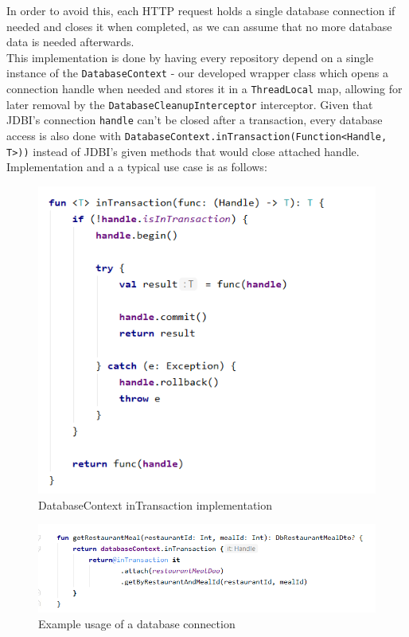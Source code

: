 In order to avoid this, each HTTP request holds a single database connection if needed
and closes it when completed, as we can assume that no more database data is needed afterwards.\\

This implementation is done by having every repository depend on a single instance of
the \texttt{DatabaseContext} - our developed wrapper class which opens a connection handle when needed
and stores it in a \texttt{ThreadLocal} map, allowing for later removal by the \texttt{DatabaseCleanupInterceptor} interceptor.
Given that JDBI's connection \texttt{handle} can't be closed after a transaction, every database access is also done with
\texttt{DatabaseContext.inTransaction(Function<Handle, T>))} instead of JDBI's given methods that would close attached handle.
Implementation and a a typical use case is as follows:\\

\begin{figure}[H]
    \begin{center}
        \includegraphics[scale=0.8]{_figures/Img 2 - DatabaseContext inTransaction implementation.png}
        \caption{DatabaseContext inTransaction implementation}
    \end{center}
\end{figure}

\begin{figure}[H]
    \begin{center}
        \includegraphics[scale=0.8]{_figures/Img 3 - Example usage of a database connection.png}
        \caption{Example usage of a database connection}
    \end{center}
\end{figure}

